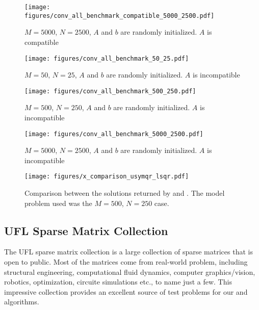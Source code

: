 \documentclass[10pt,letterpaper]{article}
\newcommand{\alg}[1]{\textproc{#1}}
\begin{document}
\begin{figure}[H]
    \centering
    \texttt{[image: figures/conv\_all\_benchmark\_compatible\_5000\_2500.pdf]}
    \caption{$M=5000$, $N=2500$, $A$ and $b$ are randomly initialized.
             $A$ is compatible}
    \label{fig:compat_5000_2500}
\end{figure}

\begin{figure}[H]
    \centering
    \texttt{[image: figures/conv\_all\_benchmark\_50\_25.pdf]}
    \caption{$M=50$, $N=25$, $A$ and $b$ are randomly initialized.
             $A$ is incompatible}
    \label{fig:incompat_50_25}
\end{figure}

\begin{figure}[H]
    \centering
    \texttt{[image: figures/conv\_all\_benchmark\_500\_250.pdf]}
    \caption{$M=500$, $N=250$, $A$ and $b$ are randomly initialized.
             $A$ is incompatible}
    \label{fig:incompat_500_250}
\end{figure}

\begin{figure}[H]
    \centering
    \texttt{[image: figures/conv\_all\_benchmark\_5000\_2500.pdf]}
    \caption{$M=5000$, $N=2500$, $A$ and $b$ are randomly initialized.
             $A$ is incompatible}
    \label{fig:incompat_5000_2500}
\end{figure}

\begin{figure}[H]
    \centering
    \texttt{[image: figures/x\_comparison\_usymqr\_lsqr.pdf]}
    \caption{Comparison between the solutions returned by \alg{USYMQR} and 
             \alg{LSQR}. The model problem used was the $M=500$, $N=250$ 
             case.}
    \label{fig:x_lsqr_usymqr}
\end{figure}

\newpage
\subsection{UFL Sparse Matrix Collection}
The UFL sparse matrix collection \cite{davis:2011} is a large collection
of sparse matrices that is open to public. Most of the matrices come
from real-world problem, including structural engineering, computational 
fluid dynamics, computer graphics/vision, robotics, optimization, 
circuite simulations etc., to name just a few. This impressive 
collection provides an excellent source of test problems for our
\alg{USYMLQ} and \alg{USYMQR} algorithms. \\ 
\end{document}
